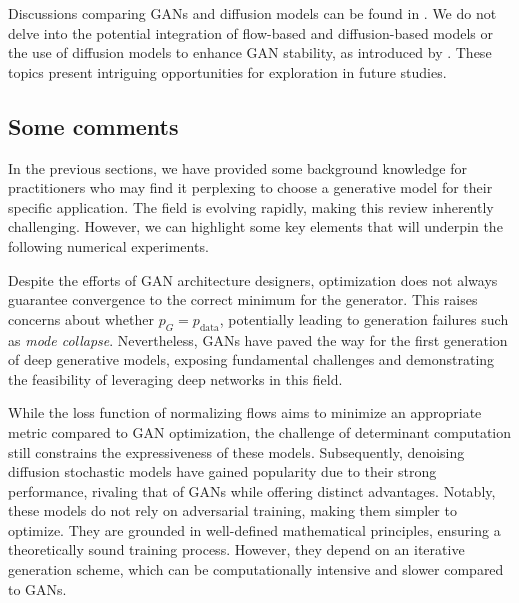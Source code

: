 \documentclass[fleqn,usenatbib]{mnras}
\begin{document}
Discussions comparing GANs and diffusion models can be found in \cite{dhariwal2021diffusion}. We do not delve into the potential integration of flow-based and diffusion-based models \citep[e.g.,][]{zhang2021diffusion,gong2021interpreting} or the use of diffusion models to enhance GAN stability, as introduced by \cite{Wang2023}. These topics present intriguing opportunities for exploration in future studies.
%

{\color{red}
\subsection{Some comments}
%

In the previous sections, we have provided some background knowledge for practitioners who may find it perplexing to choose a generative model for their specific application. The field is evolving rapidly, making this review inherently challenging. However, we can highlight some key elements that will underpin the following numerical experiments.

Despite the efforts of GAN architecture designers, optimization does not always guarantee convergence to the correct minimum for the generator. This raises concerns about whether $p_G = p_{\text{data}}$, potentially leading to generation failures such as \textit{mode collapse}. Nevertheless, GANs have paved the way for the first generation of deep generative models, exposing fundamental challenges and demonstrating the feasibility of leveraging deep networks in this field.  

While the loss function of normalizing flows aims to minimize an appropriate metric compared to GAN optimization, the challenge of determinant computation still constrains the expressiveness of these models. Subsequently, denoising diffusion stochastic models have gained popularity due to their strong performance, rivaling that of GANs while offering distinct advantages. Notably, these models do not rely on adversarial training, making them simpler to optimize. They are grounded in well-defined mathematical principles, ensuring a theoretically sound training process. However, they depend on an iterative generation scheme, which can be computationally intensive and slower compared to GANs.  

}
\end{document}
